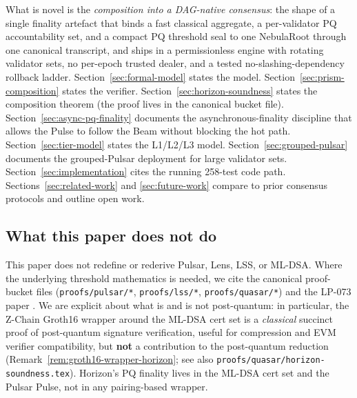 What is novel is the \emph{composition into a DAG-native consensus}: the shape of a single finality artefact that binds a fast classical aggregate, a per-validator PQ accountability set, and a compact PQ threshold seal to one NebulaRoot through one canonical transcript, and ships in a permissionless engine with rotating validator sets, no per-epoch trusted dealer, and a tested no-slashing-dependency rollback ladder. Section~\ref{sec:formal-model} states the model. Section~\ref{sec:prism-composition} states the verifier. Section~\ref{sec:horizon-soundness} states the composition theorem (the proof lives in the canonical bucket file). Section~\ref{sec:async-pq-finality} documents the asynchronous-finality discipline that allows the Pulse to follow the Beam without blocking the hot path. Section~\ref{sec:tier-model} states the L1/L2/L3 model. Section~\ref{sec:grouped-pulsar} documents the grouped-Pulsar deployment for large validator sets. Section~\ref{sec:implementation} cites the running 258-test code path. Sections~\ref{sec:related-work} and \ref{sec:future-work} compare to prior consensus protocols and outline open work.

\subsection{What this paper does not do}

This paper does not redefine or rederive Pulsar, Lens, LSS, or ML-DSA. Where the underlying threshold mathematics is needed, we cite the canonical proof-bucket files (\texttt{proofs/pulsar/*}, \texttt{proofs/lss/*}, \texttt{proofs/quasar/*}) and the LP-073 paper \cite{luxpulsar}. We are explicit about what is and is not post-quantum: in particular, the Z-Chain Groth16 wrapper around the ML-DSA cert set is a \emph{classical} succinct proof of post-quantum signature verification, useful for compression and EVM verifier compatibility, but \textbf{not} a contribution to the post-quantum reduction (Remark~\ref{rem:groth16-wrapper-horizon}; see also \texttt{proofs/quasar/horizon-soundness.tex}). Horizon's PQ finality lives in the ML-DSA cert set and the Pulsar Pulse, not in any pairing-based wrapper.
